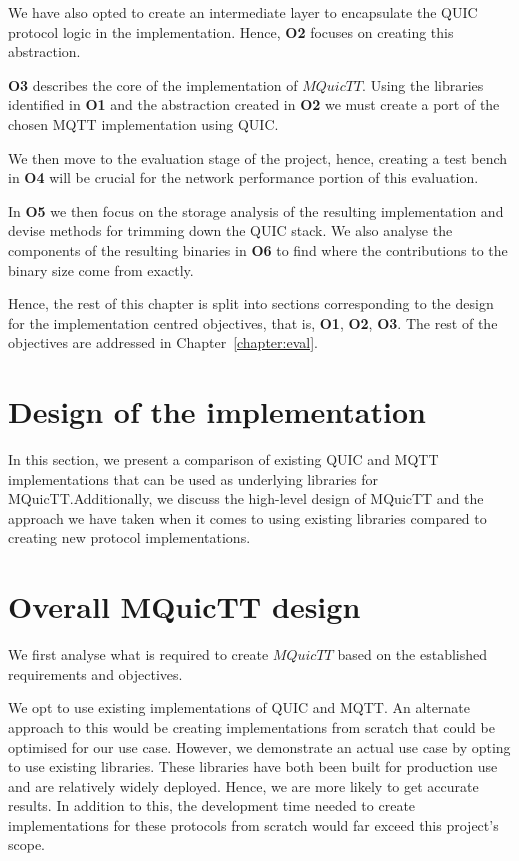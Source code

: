 We have also opted to create an intermediate layer to encapsulate the QUIC protocol logic in the implementation.
Hence, \textbf{O2} focuses on creating this abstraction.

\textbf{O3} describes the core of the implementation of $MQuicTT$.
Using the libraries identified in \textbf{O1} and the abstraction created in \textbf{O2} we must create a port of the chosen MQTT implementation using QUIC.

We then move to the evaluation stage of the project, hence, creating a test bench in \textbf{O4} will be crucial for the network performance portion of this evaluation.

In \textbf{O5} we then focus on the storage analysis of the resulting implementation and devise methods for trimming down the QUIC stack.
We also analyse the components of the resulting binaries in \textbf{O6} to find where the contributions to the binary size come from exactly.

Hence, the rest of this chapter is split into sections corresponding to the design for the implementation centred objectives, that is, \textbf{O1}, \textbf{O2}, \textbf{O3}.
The rest of the objectives are addressed in Chapter~\ref{chapter:eval}.

\section{Design of the implementation}

In this section, we present a comparison of existing QUIC and MQTT implementations that can be used as underlying libraries for MQuicTT.Additionally, we discuss the high-level design of MQuicTT and the approach we have taken when it comes to using existing libraries compared to creating new protocol implementations.

\section{Overall MQuicTT design} \label{sec:mquictt_design}

We first analyse what is required to create $MQuicTT$ based on the established requirements and objectives.

We opt to use existing implementations of QUIC and MQTT.
An alternate approach to this would be creating implementations from scratch that could be optimised for our use case.
However, we demonstrate an actual use case by opting to use existing libraries.
These libraries have both been built for production use and are relatively widely deployed.
Hence, we are more likely to get accurate results.
In addition to this, the development time needed to create implementations for these protocols from scratch would far exceed this project's scope.

